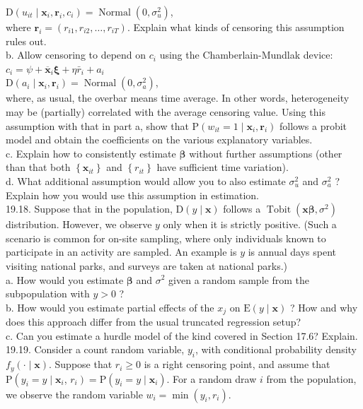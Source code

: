 \documentclass[10pt]{article}
\begin{document}
$\mathrm{D}\left(u_{i t} \mid \mathbf{x}_{i}, \mathbf{r}_{i}, c_{i}\right)=\operatorname{Normal}\left(0, \sigma_{u}^{2}\right)$,\\
where $\mathbf{r}_{i}=\left(r_{i 1}, r_{i 2}, \ldots, r_{i T}\right)$. Explain what kinds of censoring this assumption rules out.\\
b. Allow censoring to depend on $c_{i}$ using the Chamberlain-Mundlak device:\\
$c_{i}=\psi+\overline{\mathbf{x}}_{i} \boldsymbol{\xi}+\eta \bar{r}_{i}+a_{i}$\\
$\mathrm{D}\left(a_{i} \mid \mathbf{x}_{i}, \mathbf{r}_{i}\right)=\operatorname{Normal}\left(0, \sigma_{a}^{2}\right)$,\\
where, as usual, the overbar means time average. In other words, heterogeneity may be (partially) correlated with the average censoring value. Using this assumption with that in part a, show that $\mathrm{P}\left(w_{i t}=1 \mid \mathbf{x}_{i}, \mathbf{r}_{i}\right)$ follows a probit model and obtain the coefficients on the various explanatory variables.\\
c. Explain how to consistently estimate $\boldsymbol{\beta}$ without further assumptions (other than that both $\left\{\mathbf{x}_{i t}\right\}$ and $\left\{r_{i t}\right\}$ have sufficient time variation).\\
d. What additional assumption would allow you to also estimate $\sigma_{u}^{2}$ and $\sigma_{a}^{2}$ ? Explain how you would use this assumption in estimation.\\
19.18. Suppose that in the population, $\mathrm{D}(y \mid \mathbf{x})$ follows a $\operatorname{Tobit}\left(\mathbf{x} \boldsymbol{\beta}, \sigma^{2}\right)$ distribution. However, we observe $y$ only when it is strictly positive. (Such a scenario is common for on-site sampling, where only individuals known to participate in an activity are sampled. An example is $y$ is annual days spent visiting national parks, and surveys are taken at national parks.)\\
a. How would you estimate $\boldsymbol{\beta}$ and $\sigma^{2}$ given a random sample from the subpopulation with $y>0$ ?\\
b. How would you estimate partial effects of the $x_{j}$ on $\mathrm{E}(y \mid \mathbf{x})$ ? How and why does this approach differ from the usual truncated regression setup?\\
c. Can you estimate a hurdle model of the kind covered in Section 17.6? Explain.\\
19.19. Consider a count random variable, $y_{i}$, with conditional probability density $f_{y}(\cdot \mid \mathbf{x})$. Suppose that $r_{i} \geq 0$ is a right censoring point, and assume that $\mathrm{P}\left(y_{i}=y \mid \mathbf{x}_{i}\right.$, $\left.r_{i}\right)=\mathrm{P}\left(y_{i}=y \mid \mathbf{x}_{i}\right)$. For a random draw $i$ from the population, we observe the random variable $w_{i}=\min \left(y_{i}, r_{i}\right)$.\\
\end{document}
